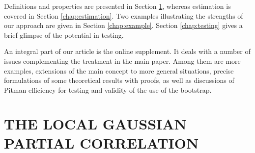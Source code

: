 \documentclass[
  12pt,
  letterpaper]{article}
\theoremstyle{definition}
\theoremstyle{definition}
\theoremstyle{definition}
\theoremstyle{remark}
\begin{document}
Definitions and properties are presented in Section \ref{chap:conditional}, whereas estimation is covered in Section \ref{chap:estimation}. Two examples illustrating the strengths of our approach are given in Section \ref{chap:example}. Section \ref{chap:testing} gives a brief glimpse of the potential in testing.

An integral part of our article is the online supplement. It deals with a number of issues complementing the treatment in the main paper. Among them are more examples, extensions of the main concept to more general situations, precise formulations of some theoretical results with proofs, as well as discussions of Pitman efficiency for testing and validity of the use of the bootstrap.

\hypertarget{chap:conditional}{%
\section{THE LOCAL GAUSSIAN PARTIAL CORRELATION}\label{chap:conditional}}
\end{document}
